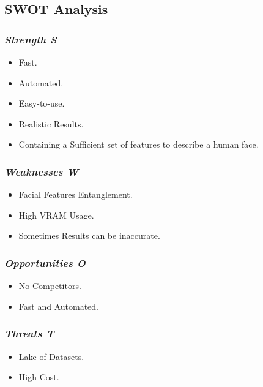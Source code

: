 \subsection{ SWOT Analysis }

\subsubsection{ \emph{Strength S} }

\begin{itemize}
    \item Fast.
    \item Automated.
    \item Easy-to-use.
    \item Realistic Results.
    \item Containing a Sufficient set of features to describe a human face.
\end{itemize}

\subsubsection{ \emph{Weaknesses W} }

\begin{itemize}
    \item Facial Features Entanglement.
    \item High VRAM Usage.
    \item Sometimes Results can be inaccurate.
\end{itemize}

\subsubsection{ \emph{ Opportunities O}} 

\begin{itemize}
    \item No Competitors.
    \item Fast and Automated.
\end{itemize}

\subsubsection{\emph{Threats T} }

\begin{itemize}
    \item Lake of Datasets.
    \item High Cost.
\end{itemize}